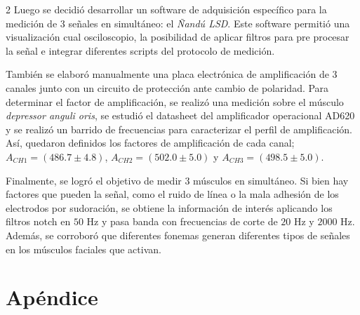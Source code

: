 \documentclass[11pt,letterpaper]{article}
\begin{document}
\begin{multicols*}{2}
Luego se decidió desarrollar un software de adquisición específico para la medición de 3 señales en simultáneo: el \textit{Ñandú LSD}. Este software permitió una visualización cual osciloscopio, la posibilidad de aplicar filtros para pre procesar la señal e integrar diferentes scripts del protocolo de medición.

También se elaboró manualmente una placa electrónica de amplificación de 3 canales junto con un circuito de protección ante cambio de polaridad. Para determinar el factor de amplificación, se realizó una medición sobre el músculo \textit{depressor anguli oris}, se estudió el datasheet del amplificador operacional AD620 y se realizó un barrido de frecuencias para caracterizar el perfil de amplificación. Así, quedaron definidos los factores de amplificación de cada canal; $A_{CH1} = (486.7 \pm 4.8)$, $A_{CH2} = (502.0 \pm 5.0)$ y $A_{CH3} = (498.5 \pm 5.0)$.

Finalmente, se logró el objetivo de medir 3 músculos en simultáneo. Si bien hay factores que pueden  la señal, como el ruido de línea o la mala adhesión de los electrodos por sudoración, se obtiene la información de interés aplicando los filtros notch en $50$ Hz y pasa banda con frecuencias de corte de $20$ Hz y $2000$ Hz. Además, se corroboró que diferentes fonemas generan diferentes tipos de señales en los músculos faciales que activan.

\section*{Apéndice}




\end{multicols*}
\end{document}
